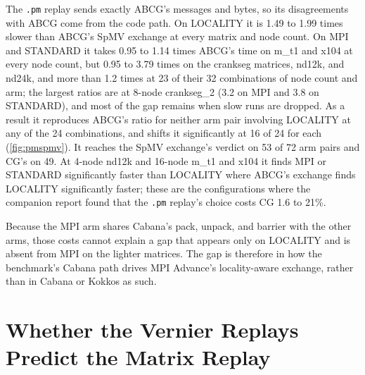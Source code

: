 \documentclass[11pt]{article}
\newcommand{\pmrep}{\texttt{.pm} replay}
\begin{document}
The \pmrep{} sends exactly ABCG's messages and bytes, so its disagreements with ABCG come
from the code path. On LOCALITY it is 1.49 to 1.99 times slower than ABCG's SpMV exchange
at every matrix and node count. On MPI and STANDARD it takes 0.95 to 1.14 times ABCG's time
on m\_t1 and x104 at every node count, but 0.95 to 3.79 times on the crankseg matrices,
nd12k, and nd24k, and more than 1.2 times at 23 of their 32 combinations of node count and
arm; the largest ratios are at 8-node crankseg\_2 (3.2 on MPI and 3.8 on STANDARD), and
most of the gap remains when slow runs are dropped. As a result it reproduces ABCG's ratio for
neither arm pair involving LOCALITY at any of the 24 combinations, and shifts it
significantly at 16 of 24 for each (\cref{fig:pmspmv}). It reaches the SpMV exchange's
verdict on 53 of 72 arm pairs and CG's on 49. At 4-node nd12k and 16-node m\_t1 and x104
it finds MPI or STANDARD significantly faster than LOCALITY where ABCG's exchange finds
LOCALITY significantly faster; these are the configurations where the companion report
found that the \pmrep's choice costs CG 1.6 to 21\%.

Because the MPI arm shares Cabana's pack, unpack, and barrier with the other arms, those
costs cannot explain a gap that appears only on LOCALITY and is absent from MPI on the
lighter matrices. The gap is therefore in how the benchmark's Cabana path drives MPI
Advance's locality-aware exchange, rather than in Cabana or Kokkos as such.

\section{Whether the Vernier Replays Predict the Matrix Replay}
\label{sec:vernier}
\end{document}

